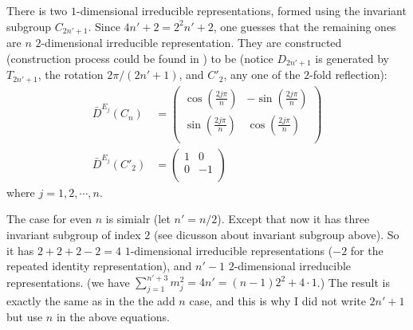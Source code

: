 There is two $1$-dimensional irreducible representations, formed using
the invariant subgroup $C_{2n'+1}$. Since $4n'+2 = 2^2 n'+2$, one
guesses that the remaining ones are $n$ $2$-dimensional irreducible
representation. They are constructed (construction process could be
found in \cite{book}) to be (notice $D_{2n'+1}$ is generated by
$T_{2n'+1}$, the rotation $2\pi/(2n'+1)$, and $C'_2$, any one of the
$2$-fold reflection):
\begin{align}
    \bar{D}^{E_j}(C_{n}) &=\left( \begin{array}{cc}
    \cos(\frac{2j\pi}{n}) & -\sin(\frac{2j\pi}{n}) \\
    \sin(\frac{2j\pi}{n}) & \cos(\frac{2j\pi}{n}) \\
        \end{array} \right) \\
    \bar{D}^{E_j}(C'_{2}) &= \left( \begin{array}{cc}
                 1 & 0 \\
                 0 & -1 \\ 
                 \end{array} \right)
\end{align}
where $j=1,2,\cdots,n$.

The case for even $n$ is simialr (let $n'=n/2$). Except that now it
has three invariant subgroup of index $2$ (see dicusson about invariant
subgroup above). So it has $2+2+2-2=4$ $1$-dimensional irreducible
representations ($-2$ for the repeated identity representation), and
$n'-1$ $2$-dimensional irreducible representations.
(we have $\sum_{j=1}^{n'+3}m_j^2 = 4n' = (n-1)2^2 + 4\cdot 1$.)
The result is exactly the same as in the the add $n$ case, and this is
why I did not write $2n'+1$ but use $n$ in the above equations.

